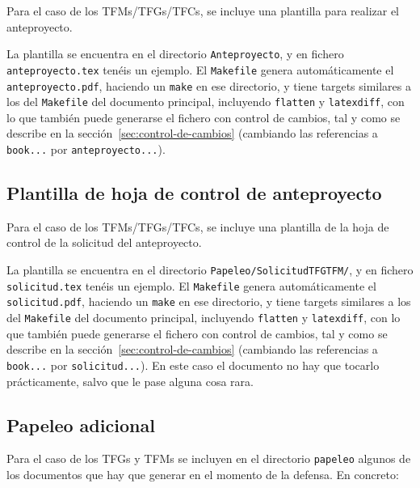 \documentclass[spanish,openright]{book}
\begin{document}
Para el caso de los TFMs/TFGs/TFCs, se incluye una plantilla para
realizar el anteproyecto.

La plantilla se encuentra en el directorio \texttt{Anteproyecto}, y en
fichero \texttt{anteproyecto.tex} tenéis un ejemplo. El
\texttt{Makefile} genera automáticamente el \texttt{anteproyecto.pdf},
haciendo un \texttt{make} en ese directorio, y tiene targets similares a los
del \texttt{Makefile} del documento principal, incluyendo
\texttt{flatten} y \texttt{latexdiff}, con lo que también puede
generarse el fichero con control de cambios, tal y como se describe en
la sección~\ref{sec:control-de-cambios} (cambiando las referencias a
\texttt{book...} por \texttt{anteproyecto...}).

\subsection{Plantilla de hoja de control de anteproyecto}
\label{sec:plantilla-de-hoja-control-anteproyecto}

Para el caso de los TFMs/TFGs/TFCs, se incluye una plantilla de la hoja
de control de la solicitud del anteproyecto.

La plantilla se encuentra en el directorio \texttt{Papeleo/SolicitudTFGTFM/}, y en
fichero \texttt{solicitud.tex} tenéis un ejemplo. El
\texttt{Makefile} genera automáticamente el \texttt{solicitud.pdf},
haciendo un \texttt{make} en ese directorio, y tiene targets similares a los
del \texttt{Makefile} del documento principal, incluyendo
\texttt{flatten} y \texttt{latexdiff}, con lo que también puede
generarse el fichero con control de cambios, tal y como se describe en
la sección~\ref{sec:control-de-cambios} (cambiando las referencias a
\texttt{book...} por \texttt{solicitud...}). En este caso el documento
no hay que tocarlo prácticamente, salvo que le pase alguna cosa rara.


\subsection{Papeleo adicional}
\label{sec:introapp1}

Para el caso de los TFGs y TFMs se incluyen en el directorio
\texttt{papeleo} algunos de los documentos que hay que generar en el
momento de la defensa. En concreto:
\end{document}
